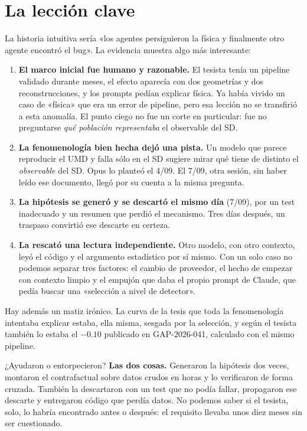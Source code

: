 \documentclass[11pt,a4paper]{article}
\begin{document}
\section{La lección clave}
La historia intuitiva sería «los agentes persiguieron la física y finalmente otro agente encontró el bug». La
evidencia muestra algo más interesante:
\begin{enumerate}
  \item \textbf{El marco inicial fue humano y razonable.} El tesista tenía un pipeline validado durante meses,
  el efecto aparecía con dos geometrías y dos reconstrucciones, y los prompts pedían explicar física. Ya había
  vivido un caso de «física» que era un error de pipeline, pero esa lección no se transfirió a esta anomalía.
  El punto ciego no fue un corte en particular: fue no preguntarse \emph{qué población representaba} el
  observable del SD.
  \item \textbf{La fenomenología bien hecha dejó una pista.} Un modelo que parece reproducir el UMD y falla
  sólo en el SD sugiere mirar qué tiene de distinto el \emph{observable} del SD. Opus lo planteó el 4/09. El
  7/09, otra sesión, sin haber leído ese documento, llegó por su cuenta a la misma pregunta.
  \item \textbf{La hipótesis se generó y se descartó el mismo día} (7/09), por un test inadecuado y un
  resumen que perdió el mecanismo. Tres días después, un traspaso convirtió ese descarte en certeza.
  \item \textbf{La rescató una lectura independiente.} Otro modelo, con otro contexto, leyó el código y el
  argumento estadístico por sí mismo. Con un solo caso no podemos separar tres factores: el cambio de
  proveedor, el hecho de empezar con contexto limpio y el empujón que daba el propio prompt de Claude, que
  pedía buscar una «selección a nivel de detector».
\end{enumerate}
Hay además un matiz irónico. La curva de la tesis que toda la fenomenología intentaba explicar estaba, ella
misma, sesgada por la selección, y según el tesista también lo estaba el $-0.10$ publicado en GAP-2026-041,
calculado con el mismo pipeline.

¿Ayudaron o entorpecieron? \textbf{Las dos cosas.} Generaron la hipótesis dos veces, montaron el
contrafactual sobre datos crudos en horas y lo verificaron de forma cruzada. También la descartaron con un
test que no podía fallar, propagaron ese descarte y entregaron código que perdía datos. No podemos saber si
el tesista, solo, lo habría encontrado antes o después: el requisito llevaba unos diez meses sin ser
cuestionado.
\end{document}
